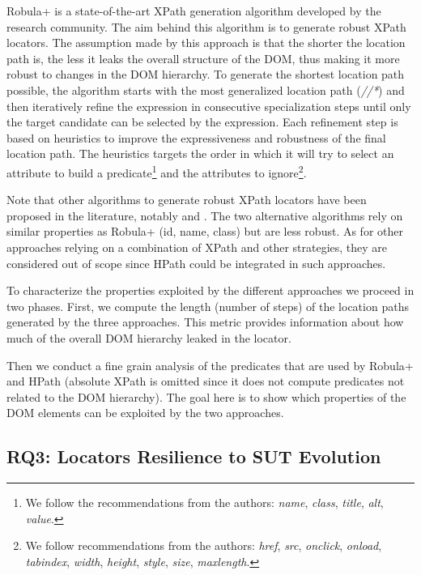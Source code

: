 Robula+\cite{Leotta2016} is a state-of-the-art XPath generation algorithm developed by the research community. The aim behind this algorithm is to generate robust XPath locators. The assumption made by this approach is that the shorter the location path is, the less it leaks the overall structure of the DOM, thus making it more robust to changes in the DOM hierarchy. To generate the shortest location path possible, the algorithm starts with the most generalized location path (\emph{//*}) and then iteratively refine the expression in consecutive specialization steps until only the target candidate can be selected by the expression. Each refinement step is based on heuristics to improve the expressiveness and robustness of the final location path. The heuristics targets the order in which it will try to select an attribute to build a predicate\footnote{We follow the recommendations from the authors: \emph{name}, \emph{class}, \emph{title}, \emph{alt}, \emph{value}.} and the attributes to ignore\footnote{We follow recommendations from the authors: \emph{href}, \emph{src}, \emph{onclick}, \emph{onload}, \emph{tabindex}, \emph{width}, \emph{height}, \emph{style}, \emph{size}, \emph{maxlength}.}.

Note that other algorithms to generate robust XPath locators have been proposed in the literature, notably \citep{Montoto2011} and \citep{Thummalapenta2013}. The two alternative algorithms rely on similar properties as Robula+ (id, name, class) but are less robust\cite{Leotta2016}. As for other approaches relying on a combination of XPath and other strategies\cite{Leotta2015, Aldalur2017}, they are considered out of scope since HPath could be integrated in such approaches.

To characterize the properties exploited by the different approaches we proceed in two phases. First, we compute the length (number of steps) of the location paths generated by the three approaches. This metric provides information about how much of the overall DOM hierarchy leaked in the locator.

Then we conduct a fine grain analysis of the predicates that are used by Robula+ and HPath (absolute XPath is omitted since it does not compute predicates not related to the DOM hierarchy). The goal here is to show which properties of the DOM elements can be exploited by the two approaches.

\subsection{RQ3: Locators Resilience to SUT Evolution}
\label{sec:hpath-protocol-rq3}

